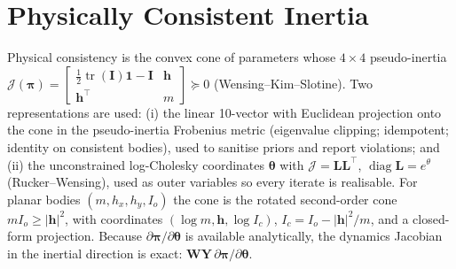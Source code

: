 \documentclass[11pt,a4paper]{article}
\newcommand{\bh}{\mathbf{h}}
\newcommand{\bY}{\mathbf{Y}}
\newcommand{\bW}{\mathbf{W}}
\newcommand{\bpi}{\boldsymbol{\pi}}
\newcommand{\btheta}{\boldsymbol{\theta}}
\begin{document}
\section{Physically Consistent Inertia}
\label{sec:consistency}
Physical consistency is the convex cone of parameters whose $4\times4$
pseudo-inertia
$\mathcal{J}(\bpi)=\begin{bmatrix}\tfrac12\operatorname{tr}(\mathbf{I})\mathbf{1}-\mathbf{I} & \bh\\ \bh^{\!\top} & m\end{bmatrix}\succeq0$
(Wensing--Kim--Slotine).  Two representations are used:
(i) the linear 10-vector with Euclidean projection onto the cone in the
pseudo-inertia Frobenius metric (eigenvalue clipping; idempotent; identity on
consistent bodies), used to sanitise priors and report violations; and
(ii) the unconstrained log-Cholesky coordinates $\btheta$ with
$\mathcal{J}=\mathbf{L}\mathbf{L}^{\!\top}$, $\operatorname{diag}\mathbf{L}=e^{\theta}$
(Rucker--Wensing), used as outer variables so every iterate is realisable.
For planar bodies $(m,h_x,h_y,I_o)$ the cone is the rotated second-order cone
$mI_o\ge|\bh|^2$, with coordinates $(\log m,\bh,\log I_c)$,
$I_c=I_o-|\bh|^2/m$, and a closed-form projection.  Because
$\partial\bpi/\partial\btheta$ is available analytically, the dynamics
Jacobian in the inertial direction is exact: $\bW\bY\,\partial\bpi/\partial\btheta$.
\end{document}
